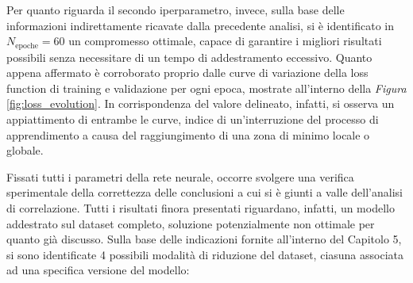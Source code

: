 Per quanto riguarda il secondo iperparametro, invece, sulla base delle informazioni indirettamente ricavate dalla precedente analisi, si è identificato in $N_{\text{epoche}} = 60$ un compromesso ottimale, capace di garantire i migliori risultati possibili senza necessitare di un tempo di addestramento eccessivo. Quanto appena affermato è corroborato proprio dalle curve di variazione della loss function di training e validazione per ogni epoca, mostrate all'interno della \emph{Figura} \ref{fig:loss_evolution}. In corrispondenza del valore delineato, infatti, si osserva un appiattimento di entrambe le curve, indice di un'interruzione del processo di apprendimento a causa del raggiungimento di una zona di minimo locale o globale.   


Fissati tutti i parametri della rete neurale, occorre svolgere una verifica sperimentale della correttezza delle conclusioni a cui si è giunti a valle dell'analisi di correlazione. Tutti i risultati finora presentati riguardano, infatti, un modello addestrato sul dataset completo, soluzione potenzialmente non ottimale per quanto già discusso. Sulla base delle indicazioni fornite all'interno del Capitolo 5, si sono identificate 4 possibili modalità di riduzione del dataset, ciasuna associata ad una specifica versione del modello:

